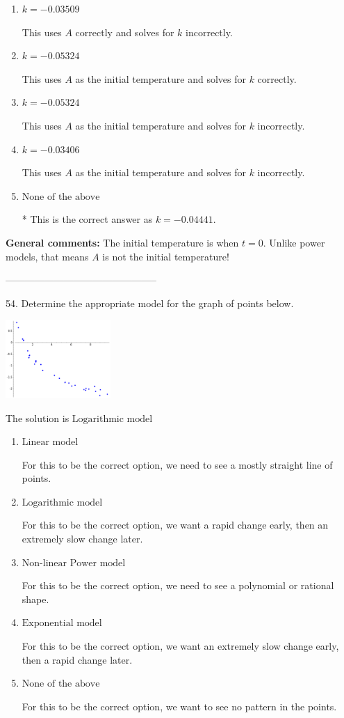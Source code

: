 \documentclass{extbook}[14pt]
\begin{document}
\begin{enumerate}[label=\Alph*.] 
\item $ k = -0.03509 $ 

 This uses $A$ correctly and solves for $k$ incorrectly. 
\item $ k = -0.05324 $ 

 This uses $A$ as the initial temperature and solves for $k$ correctly. 
\item $ k = -0.05324 $ 

 This uses $A$ as the initial temperature and solves for $k$ incorrectly. 
\item $ k = -0.03406 $ 

 This uses $A$ as the initial temperature and solves for $k$ incorrectly. 
\item $ \text{None of the above} $ 

 * This is the correct answer as $k = -0.04441$. 
\end{enumerate} 
 
\textbf{General comments:} The initial temperature is when $t = 0$. Unlike power models, that means $A$ is not the initial temperature!

-----------------------------------------------

54. Determine the appropriate model for the graph of points below.
\begin{center} \includegraphics[width=0.3\textwidth]{../Figures/identifyModelGraph11C.png} \end{center} 

The solution is $ \text{Logarithmic model} $ 

\begin{enumerate}[label=\Alph*.] 
\item $ \text{Linear model} $ 

 For this to be the correct option, we need to see a mostly straight line of points. 
\item $ \text{Logarithmic model} $ 

 For this to be the correct option, we want a rapid change early, then an extremely slow change later. 
\item $ \text{Non-linear Power model} $ 

 For this to be the correct option, we need to see a polynomial or rational shape. 
\item $ \text{Exponential model} $ 

 For this to be the correct option, we want an extremely slow change early, then a rapid change later. 
\item $ \text{None of the above} $ 

 For this to be the correct option, we want to see no pattern in the points. 
\end{enumerate} 
 
\end{document}
